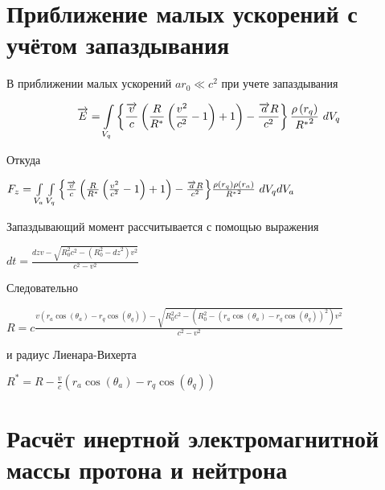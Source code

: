 \documentclass{article}
\begin{document}
\section{Приближение малых ускорений с учётом запаздывания}

В приближении малых ускорений $a{{r}_{0}}\ll {{c}^{2}}$ при учете запаздывания


\[\overrightarrow{E}=\int\limits_{{{V}_{q}}}\\
{\left\{ \frac{\overrightarrow{v}}{c}\left( \frac{R}{{{R}^{*}}}\left( \frac{{{v}^{2}}}{{{c}^{2}}}-1 \right)+1 \right)-\frac{\overrightarrow{a}R}{{{c}^{2}}} \right\}\frac{\rho \left( {{r}_{q}} \right)}{{{R}^{*}}^{2}}\ }d{{V }_{q}}\]

Откуда

${{F}_{z}}=\int\limits_{{{V}_{a}}}{\int\limits_{{{V}_{q}}} \\
{\left\{ \frac{\overrightarrow{v}}{c}\left( \frac{R}{{{R}^{*}}}\left( \frac{{{v}^{2}}}{{{c}^{2}}}-1 \right)+1 \right)-\frac{\overrightarrow{a}R}{{{c}^{2}}} \right\} } \\
{\frac{\rho \left( {{r}_{q}} \right)\rho \left( {{r}_{a}} \right)}{{R^{*}}^{2}}}}\ d{{V}_{q}}d{{V}_{a}}$

Запаздывающий момент рассчитывается с помощью выражения

$\mathit{dt} = \frac{\mathit{dz} v - \sqrt{R_{0}^{2} c^{2} - {\left(R_{0}^{2} - \mathit{dz}^{2}\right)} v^{2}}}{c^{2} - v^{2}}$

Следовательно

$R = c \frac{  v {\left( {{r}_{a}}\cos \left( {{\theta }_{a}} \right)-{{r}_{q}}\cos \left( {{\theta }_{q}} \right) \right)} - \sqrt{R_{0}^{2} c^{2} - {\left(R_{0}^{2} - {\left( {{r}_{a}}\cos \left( {{\theta }_{a}} \right)-{{r}_{q}}\cos \left( {{\theta }_{q}} \right) \right)}^{2}\right)} v^{2}}}{c^{2} - v^{2}}$

и радиус Лиенара-Вихерта

${{R}^{*}}=R-\frac{v}{c}\left( {{r}_{a}}\cos \left( {{\theta }_{a}} \right)-{{r}_{q}}\cos \left( {{\theta }_{q}} \right) \right)$

\section{Расчёт инертной электромагнитной массы протона и нейтрона}
\end{document}
